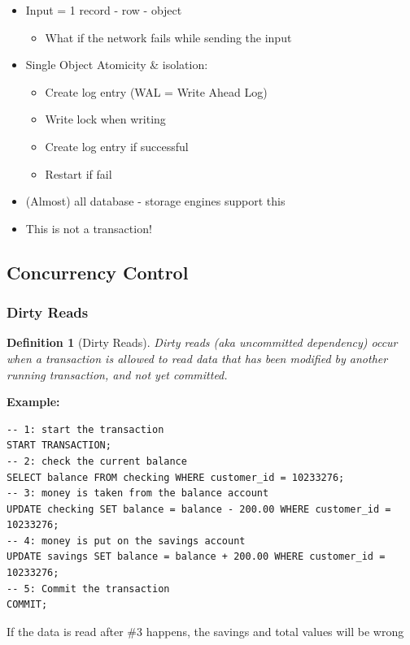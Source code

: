 \documentclass{article}
\newtheorem{theorem}{Definition}[section]
\begin{document}
\begin{itemize}
    \item Input = 1 record - row - object
    \begin{itemize}
        \item What if the network fails while sending the input
    \end{itemize}
    \item Single Object Atomicity \& isolation:
    \begin{itemize}
        \item Create log entry (WAL = Write Ahead Log)
        \item Write lock when writing
        \item Create log entry if successful
        \item Restart if fail
    \end{itemize}
    \item (Almost) all database - storage engines support this
    \item This is not a transaction!
\end{itemize}

\subsection{Concurrency Control}

\subsubsection{Dirty Reads}

\begin{theorem}[Dirty Reads]
Dirty reads (aka uncommitted dependency) occur when a transaction is allowed 
to read data that has been modified by another running transaction, 
and not yet committed.
\end{theorem}

\textbf{Example: } 

\begin{verbatim}
-- 1: start the transaction
START TRANSACTION;
-- 2: check the current balance
SELECT balance FROM checking WHERE customer_id = 10233276;
-- 3: money is taken from the balance account
UPDATE checking SET balance = balance - 200.00 WHERE customer_id = 10233276;
-- 4: money is put on the savings account
UPDATE savings SET balance = balance + 200.00 WHERE customer_id = 10233276;
-- 5: Commit the transaction
COMMIT;
\end{verbatim}

If the data is read after \#3 happens, the savings and total values will be wrong
\end{document}
